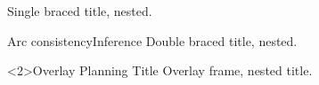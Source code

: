 \documentclass{beamer}
\begin{document}
\begin{frame}[c]{}
Single braced title, nested.
\end{frame}

\begin{frame}[c]{Arc consistency}{{\sc Inference}}
Double braced title, nested.
\end{frame}

\begin{frame}<2>{Overlay {Planning} Title}
Overlay frame, nested title.
\end{frame}
\end{document}
